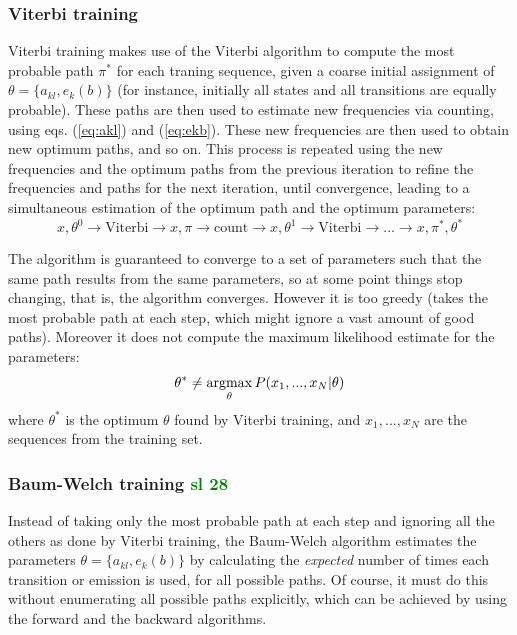 \subsubsection{Viterbi training}

Viterbi training makes use of the Viterbi algorithm to compute the most probable path $\pi^*$ for each traning sequence, given a coarse initial assignment of $\theta = \{ a_{kl}, e_k(b) \}$ (for instance, initially all states and all transitions are equally probable). These paths are then used to estimate new frequencies via counting, using eqs. (\ref{eq:akl}) and (\ref{eq:ekb}). These new frequencies are then used to obtain new optimum paths, and so on. This process is repeated using the new frequencies and the optimum paths from the previous iteration to refine the frequencies and paths for the next iteration, until convergence, leading to a simultaneous estimation of the optimum path and the optimum parameters:
%
\begin{equation}
x,\theta^0 \rightarrow \text{Viterbi} \rightarrow x, \pi \rightarrow 
\text{count} \rightarrow x,\theta^1 \rightarrow \text{Viterbi} 
\rightarrow ... \rightarrow x,\pi^*, \theta^*
\end{equation}

The algorithm is guaranteed to converge to a set of parameters such that the same path results from the same parameters, so at some point things stop changing, that is, the algorithm converges.
However it is too greedy (takes the most probable path at each step, which might ignore a vast amount of good paths). Moreover it does not compute the maximum likelihood estimate for the parameters:
\begin{equation}
\theta^* \ne \argmax_\theta P(x_1, ..., x_N|\theta)
\end{equation}
where $\theta^*$ is the optimum $\theta$ found by Viterbi training, and $x_1,...,x_N$ are the sequences from the training set.

\subsubsection{Baum-Welch training \textcolor{green}{sl 28}}
\label{sec:baumwelch}

Instead of taking only the most probable path at each step and ignoring all the others as done by Viterbi training, the Baum-Welch algorithm estimates the parameters $\theta = \{ a_{kl}, e_k(b) \}$ by calculating the {\em expected} number of times each transition or emission is used, for all possible paths. Of course, it must do this without enumerating all possible paths explicitly, which can be achieved by using the forward and the backward algorithms.

